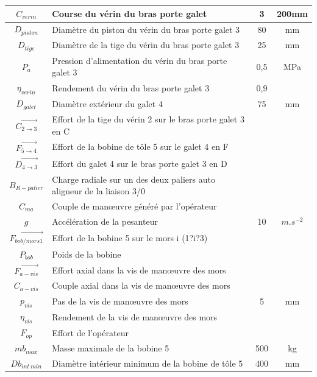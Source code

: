 \begin{table}
\begin{tabular}{|c|l|c|c|}
\hline
$C_{verin}$ & Course du vérin du bras porte galet & 3 & 200mm \\ \hline
$D_{piston}$ & Diamètre du piston du vérin du bras porte galet 3 &80& mm \\ \hline
$D_{tige}$ & Diamètre de la tige du vérin du bras porte galet 3 &25& mm \\ \hline
$P_a$ & Pression d'alimentation du vérin du bras porte galet 3 &0,5& MPa \\ \hline
$\eta_{verin}$ & Rendement du vérin du bras porte galet 3 &0,9& \\ \hline
$D_{galet}$ & Diamètre extérieur du galet 4 &75& mm \\ \hline
$\overrightarrow{C_{2\rightarrow 3}}$ & Effort de la tige du vérin 2 sur le bras porte galet 3 en C & &  \\ \hline
$\overrightarrow{F_{5\rightarrow 4}}$ & Effort de la bobine de tôle 5 sur le galet 4 en F & &  \\ \hline
$\overrightarrow{D_{4\rightarrow 3}}$ & Effort du galet 4 sur le bras porte galet 3 en D & &  \\ \hline
$B_{R-palier}$ & Charge radiale sur un des deux paliers auto aligneur de la liaison 3/0 & & \\ \hline
$C_{ma}$ & Couple de man\oe uvre généré par l'opérateur & &  \\ \hline
$g$ & Accélération de la pesanteur & 10 & $m.s^{-2}$  \\ \hline
$\overrightarrow{F_{bob/mors 1}}$ & Effort de la bobine 5 sur le mors i (1?i?3) & &  \\ \hline
$P_{bob}$ & Poids de la bobine & &  \\ \hline
$\overrightarrow{F_{a-vis}}$ & Effort axial dans la vis de man\oe uvre des mors & &  \\ \hline
$C_{a-vis}$ & Couple axial dans la vis de man\oe uvre des mors & &  \\ \hline
$p_{vis}$ & Pas de la vis de man\oe uvre des mors &5& mm  \\ \hline
$\eta_{vis}$ & Rendement de la vis de man\oe uvre des mors & &  \\ \hline
$F_{op}$ & Effort de l'opérateur & &  \\ \hline
$mb_{max}$ & Masse maximale de la bobine 5 &500& kg \\ \hline
$Db_{int\ min}$ & Diamètre intérieur minimum de la bobine de tôle 5 & 400 & mm \\ \hline

\end{tabular}
\end{table}
